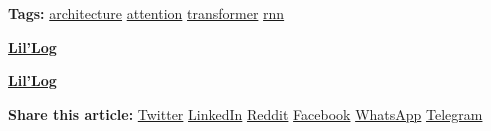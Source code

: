\documentclass[12pt]{article}
\begin{document}
\vspace{2em}
\noindent
\textbf{Tags:}
\href{https://lilianweng.github.io/posts/2018-06-24-attention/}{architecture} \quad
\href{https://lilianweng.github.io/posts/2018-06-24-attention/}{attention} \quad
\href{https://lilianweng.github.io/posts/2018-06-24-attention/}{transformer} \quad
\href{https://lilianweng.github.io/posts/2018-06-24-attention/}{rnn}

\vspace{2em}
\noindent
\begin{minipage}{0.48\textwidth}
    \raggedright
    \textbf{\href{https://lilianweng.github.io/}{\textlangle\quad Lil'Log}}
\end{minipage}
\hfill
\begin{minipage}{0.48\textwidth}
    \raggedleft
    \textbf{\href{https://lilianweng.github.io/}{Lil'Log \quad\textrangle}}
\end{minipage}
\vspace{2em}

\begin{center}
  \vspace{1em}
  \textbf{Share this article:}
  \href{https://twitter.com/intent/tweet/?text=Attention%3f%20Attention%21&url=https%3a%2f%2flilianweng.github.io%2fposts%2f2018-06-24-attention%2f&hashtags=architecture,attention,transformer,rnn}{Twitter} \textbar{}
  \href{https://www.linkedin.com/shareArticle?mini=true&url=https%3a%2f%2flilianweng.github.io%2fposts%2f2018-06-24-attention%2f&title=Attention%3f%20Attention%21&summary=Attention%3f%20Attention%21&source=https%3a%2f%2flilianweng.github.io%2fposts%2f2018-06-24-attention%2f}{LinkedIn} \textbar{}
  \href{https://reddit.com/submit?url=https%3a%2f%2flilianweng.github.io%2fposts%2f2018-06-24-attention%2f&title=Attention%3f%20Attention%21}{Reddit} \textbar{}
  \href{https://facebook.com/sharer/sharer.php?u=https%3a%2f%2flilianweng.github.io%2fposts%2f2018-06-24-attention%2f}{Facebook} \textbar{}
  \href{https://api.whatsapp.com/send?text=Attention%3f%20Attention%21%20-%20https%3a%2f%2flilianweng.github.io%2fposts%2f2018-06-24-attention%2f}{WhatsApp} \textbar{}
  \href{https://telegram.me/share/url?text=Attention%3f%20Attention%21&url=https%3a%2f%2flilianweng.github.io%2fposts%2f2018-06-24-attention%2f}{Telegram}
\end{center}

\vspace{2em}
\end{document}

